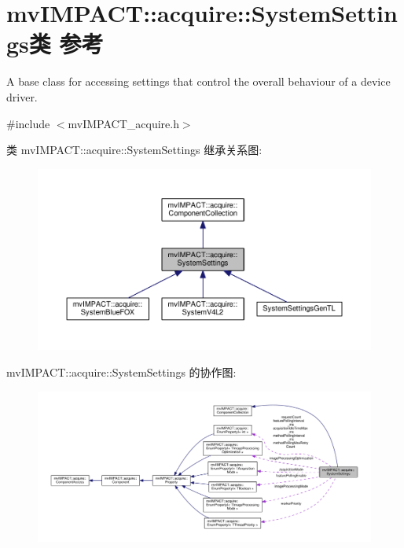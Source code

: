 \hypertarget{classmv_i_m_p_a_c_t_1_1acquire_1_1_system_settings}{\section{mv\+I\+M\+P\+A\+C\+T\+:\+:acquire\+:\+:System\+Settings类 参考}
\label{classmv_i_m_p_a_c_t_1_1acquire_1_1_system_settings}
}


A base class for accessing settings that control the overall behaviour of a device driver.  




{\ttfamily \#include $<$mv\+I\+M\+P\+A\+C\+T\+\_\+acquire.\+h$>$}



类 mv\+I\+M\+P\+A\+C\+T\+:\+:acquire\+:\+:System\+Settings 继承关系图\+:
\nopagebreak
\begin{figure}[H]
\begin{center}
\leavevmode
\includegraphics[width=350pt]{classmv_i_m_p_a_c_t_1_1acquire_1_1_system_settings__inherit__graph}
\end{center}
\end{figure}


mv\+I\+M\+P\+A\+C\+T\+:\+:acquire\+:\+:System\+Settings 的协作图\+:
\nopagebreak
\begin{figure}[H]
\begin{center}
\leavevmode
\includegraphics[width=350pt]{classmv_i_m_p_a_c_t_1_1acquire_1_1_system_settings__coll__graph}
\end{center}
\end{figure}
